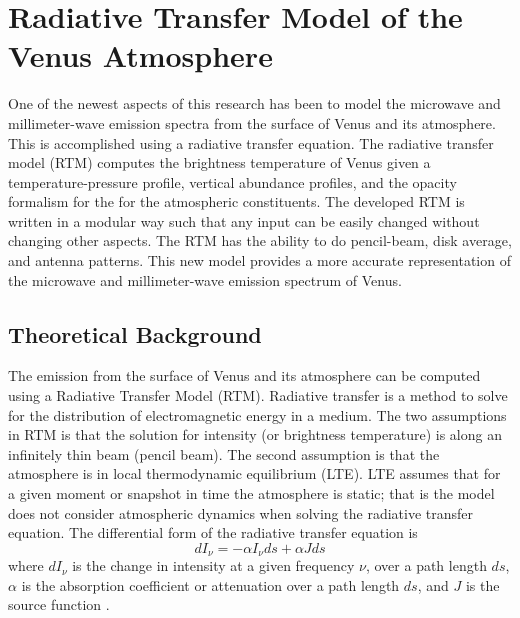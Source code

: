 \chapter{Radiative Transfer Model of the Venus Atmosphere}


One of the newest aspects of this research has been to model the microwave and millimeter-wave emission spectra from the surface of Venus and its atmosphere. This is accomplished using a radiative transfer equation. The radiative transfer model (RTM) computes the brightness temperature of Venus given a temperature-pressure profile, vertical abundance profiles, and the opacity formalism for the for the atmospheric constituents. The developed RTM is written in a modular way such that any input can be easily changed without changing other aspects. The RTM has the ability to do pencil-beam, disk average, and antenna patterns. This new model provides a more accurate representation of the microwave and millimeter-wave emission spectrum of Venus. 

\section{Theoretical Background}

The emission from the surface of Venus and its atmosphere can be computed using a Radiative Transfer Model (RTM). Radiative transfer is a method to solve for the distribution of electromagnetic energy in a medium. The two assumptions in RTM is that the solution for intensity (or brightness temperature) is along an infinitely thin beam (pencil beam). The second assumption is that the atmosphere is in local thermodynamic equilibrium (LTE). LTE assumes that for a given moment or snapshot in time the atmosphere is static; that is the model does not consider atmospheric dynamics when solving the radiative transfer equation. The differential form of the radiative transfer equation is
\begin{equation}\label{eq:rtm-diff}
dI_{\nu}= -\alpha I_{\nu }ds + \alpha J ds
\end{equation}
 where $dI_\nu$ is the change in intensity at a given frequency $\nu$, over a path length $ds$, $\alpha$ is the absorption coefficient or attenuation over a path length $ds$, and $J$ is the source function \cite{Liou-2002}. 


